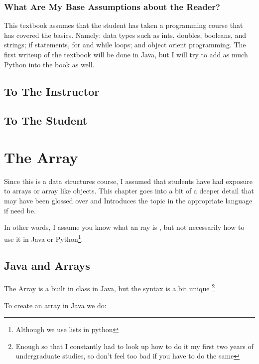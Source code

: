 \documentclass[10pt,a4paper]{book}
\begin{document}
\subsection{What Are My Base Assumptions about the Reader?}

This textbook assumes that the student has taken a programming course that has covered the basics.
Namely: data types such as ints, doubles, booleans, and strings; if statements, for and while loops; and object orient programming.
The first writeup of the textbook will be done in Java, but I will try to add as much Python into the book as well.


\section{To The Instructor}


\section{To The Student}




\chapter{The Array}

Since this is a data structures course, I assumed that students have had exposure to arrays or array like objects.
This chapter goes into a bit of a deeper detail that may have been glossed over and Introduces the topic in the appropriate language if need be.

In other words, I assume you know what an ray is , but not necessarily how to use it in Java or Python\footnote{Although we use lists in python}.





\section{Java and Arrays}
The Array is a built in class in Java, but the syntax is a bit unique \footnote{Enough so that I constantly had to look up how to do it my first two years of undergraduate studies, so don't feel too bad if you have to do the same}

To create an array in Java we do:
\end{document}
